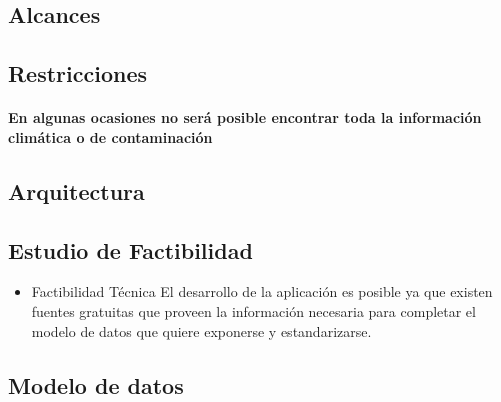   \subsection{Alcances}

  \subsection{Restricciones}
    \paragraph{En algunas ocasiones no será posible encontrar toda la información climática o de contaminación}

  \subsection{Arquitectura}
  \begin{itemize}
    
  \end{itemize}

  \subsection{Estudio de Factibilidad}
  \begin{itemize}
    \item Factibilidad Técnica
      El desarrollo de la aplicación es posible ya que existen fuentes gratuitas que proveen la información necesaria para completar el modelo de datos que quiere exponerse y estandarizarse. 

  \end{itemize}
  
  \newpage
  \subsection{Modelo de datos} 
